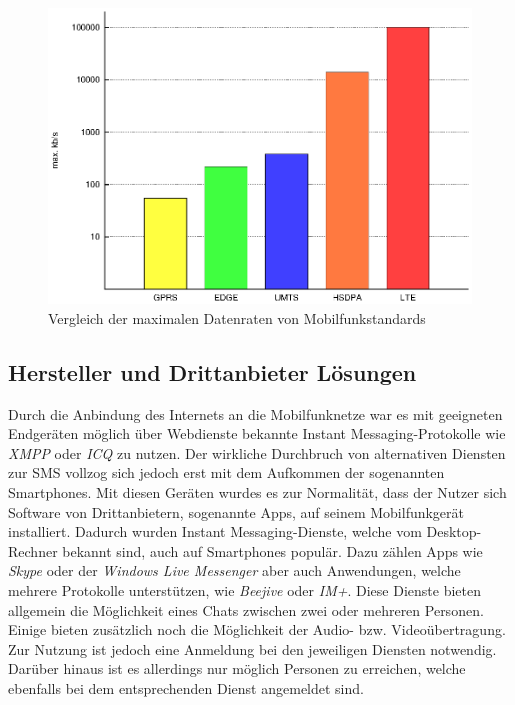 \documentclass[german,12pt,a4paper]{article}
\begin{document}
 \begin{figure}
     \centering
     \includegraphics[width=\textwidth]{plot/datenraten}
     \caption{Vergleich der maximalen Datenraten von Mobilfunkstandards}
     \label{fig:datenraten}
 \end{figure}


 \subsection{Hersteller und Drittanbieter Lösungen} %
 \label{sub:drittanbieter}


 Durch die Anbindung des Internets an die Mobilfunknetze war es mit geeigneten Endgeräten möglich
 über Webdienste bekannte Instant Messaging-Protokolle wie \textit{XMPP} oder \textit{ICQ} zu
 nutzen. Der wirkliche Durchbruch von alternativen Diensten zur SMS vollzog sich jedoch erst mit dem
 Aufkommen der sogenannten \glqq{}Smartphones\grqq{}. Mit diesen Geräten wurdes es zur Normalität,
 dass der Nutzer sich Software von Drittanbietern, sogenannte \glqq{}Apps\grqq{}, auf seinem
 Mobilfunkgerät installiert. Dadurch wurden Instant Messaging-Dienste, welche vom Desktop-Rechner
 bekannt sind, auch auf Smartphones populär. Dazu zählen Apps wie \textit{Skype} oder der
 \textit{Windows Live Messenger} aber auch Anwendungen, welche mehrere Protokolle unterstützen, wie
 \textit{Beejive} oder \textit{IM+}. Diese Dienste bieten allgemein die Möglichkeit eines Chats
 zwischen zwei oder mehreren Personen. Einige bieten zusätzlich noch die Möglichkeit der Audio- bzw.
 Videoübertragung. Zur Nutzung ist jedoch eine Anmeldung bei den jeweiligen Diensten notwendig.
 Darüber hinaus ist es allerdings nur möglich Personen zu erreichen, welche ebenfalls bei dem
 entsprechenden Dienst angemeldet sind.
\end{document}
